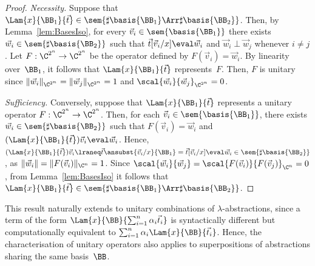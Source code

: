 \begin{proof}
  \textit{Necessity.}
  Suppose that $\Lam{x}{{\BB_1}}{\vec{t}}\in\sem{\sharp\basis{\BB_1}\Arr\sharp\basis{\BB_2}}$.
  Then, by Lemma~\ref{lem:BasesIso}, for every
  $\vec{v}_{i}\in\sem{\basis{\BB_1}}$ there exists
  $\vec{w}_{i}\in\sem{\sharp\basis{\BB_2}}$ such that
  $\vec{t}[\vec{v}_{i}/x]\eval\vec{w}_{i}$ and
  $\vec{w}_{i}\perp\vec{w}_{j}$ whenever $i\neq j$.
  Let $F:\C^{2^n}\to\C^{2^n}$ be the operator defined by
  $F(\vec{v}_{i})=\vec{w}_{i}$.
  By linearity over~$\BB_1$, it follows that
  $\Lam{x}{{\BB_1}}{\vec{t}}$ represents~$F$.
  Then, $F$ is unitary since
  $\|\vec{w}_{i}\|_{\C^{2^n}}=\|\vec{w}_{j}\|_{\C^{2^n}}=1$ and
  $\scal{\vec{w}_{i}}{\vec{w}_{j}}_{\C^{2^n}}=0$.

  \smallskip
  \textit{Sufficiency.}
  Conversely, suppose that $\Lam{x}{{\BB_1}}{\vec{t}}$ represents a
  unitary operator $F:\C^{2^n}\to\C^{2^n}$.
  Then, for each $\vec{v}_{i}\in\sem{\basis{\BB_1}}$, there exists
  $\vec{w}_{i}\in\sem{\sharp\basis{\BB_2}}$ such that
  $F(\vec{v}_{i}) = \vec{w}_{i}$ and
  $(\Lam{x}{{\BB_1}}{\vec{t}})\vec{v}_{i}\eval\vec{w}_{i}$.
  Hence,
  \(
    (\Lam{x}{{\BB_1}}{\vec{t}})\vec{v}_{i}
    \lraneq
    \vec{t}\ansubst{\vec{v}_{i}/x}{\BB_1}
    = \vec{t}[\vec{v}_{i}/x]
    \eval \vec{w}_{i}
    \in \sem{\sharp\basis{\BB_2}}
  \),
  as $\|\vec{w}_{i}\|=\|F(\vec{v}_{i})\|_{\C^n}=1$. Since
  \(
    \scal{\vec{w}_{i}}{\vec{w}_{j}}
    = \scal{F(\vec{v}_{i})}{F(\vec{v}_{j})}_{\C^n}
    = 0
  \),
  from Lemma~\ref{lem:BasesIso} it follows that
  $\Lam{x}{{\BB_1}}{\vec{t}}\in\sem{\sharp\basis{\BB_1}\Arr\sharp\basis{\BB_2}}$.
  \qedhere
\end{proof}

This result naturally extends to unitary combinations of
$\lambda$-ab\-strac\-tions, since a term of the form
$\Lam{x}{{\BB}}{\sum_{i=1}^{n}\alpha_i \vec{t}_{i}}$ is syntactically different
but computationally equivalent to $\sum_{i=1}^{n}\alpha_i
\Lam{x}{{\BB}}{\vec{t}_{i}}$.  Hence, the characterisation of unitary operators
also applies to superpositions of abstractions sharing the same basis~$\BB$.
